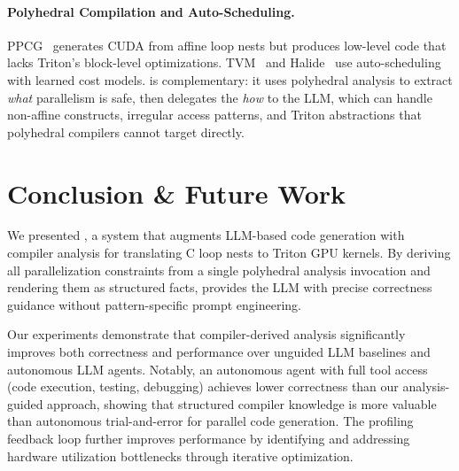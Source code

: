 \documentclass[sigconf]{acmart}
\begin{document}
\paragraph{Polyhedral Compilation and Auto-Scheduling.}
PPCG~\cite{verdoolaege2013ppcg} generates CUDA from affine loop nests but produces low-level code that lacks Triton's block-level optimizations.
TVM~\cite{chen2018tvm} and Halide~\cite{ragan2013halide} use auto-scheduling with learned cost models.
\sysname is complementary: it uses polyhedral analysis to extract \emph{what} parallelism is safe, then delegates the \emph{how} to the LLM, which can handle non-affine constructs, irregular access patterns, and Triton abstractions that polyhedral compilers cannot target directly.


\section{Conclusion \& Future Work}
\label{sec:conclusion}
We presented \sysname, a system that augments LLM-based code generation with compiler analysis for translating C loop nests to Triton GPU kernels. By deriving all parallelization constraints from a single polyhedral analysis invocation and rendering them as structured facts, \sysname provides the LLM with precise correctness guidance without pattern-specific prompt engineering.

Our experiments demonstrate that compiler-derived analysis significantly improves both correctness and performance over unguided LLM baselines and autonomous LLM agents. Notably, an autonomous agent with full tool access (code execution, testing, debugging) achieves lower correctness than our analysis-guided approach, showing that structured compiler knowledge is more valuable than autonomous trial-and-error for parallel code generation. The profiling feedback loop further improves performance by identifying and addressing hardware utilization bottlenecks through iterative optimization.
\end{document}
